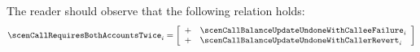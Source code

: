 \saNote{}\label{hub: scenario: note: calls that require both accounts twice partition} The reader should observe that the following relation holds:
\[
	\scenCallRequiresBothAccountsTwice       _{i}
	=
	\left[ \begin{array}{cl}
		+ & \scenCallBalanceUpdateUndoneWithCalleeFailure  _{i} \\
		+ & \scenCallBalanceUpdateUndoneWithCallerRevert   _{i} \\
	\end{array} \right]
\]
